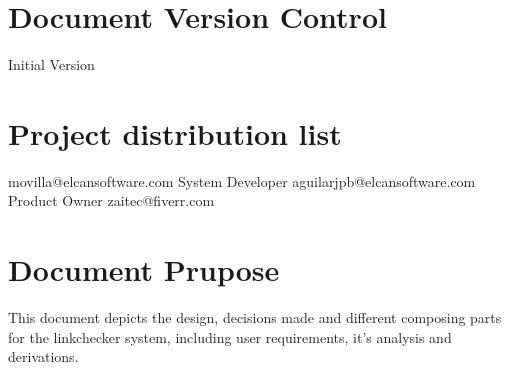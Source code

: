 \section{Document Version Control}
\begin{elcanversions}
	 {Initial Version}
\end{elcanversions}

\section{Project distribution list}

\begin{elcandistribution}

	 {movilla@elcansoftware.com} {\distribdate} 
	 {System Developer} {aguilarjpb@elcansoftware.com} {\distribdate}
	 {Product Owner} {zaitec@fiverr.com} {\distribdate}	
\end{elcandistribution}

\section{Document Prupose}
This document depicts the design, decisions made and different composing parts for the linkchecker system, including user requirements, it's analysis and derivations.

